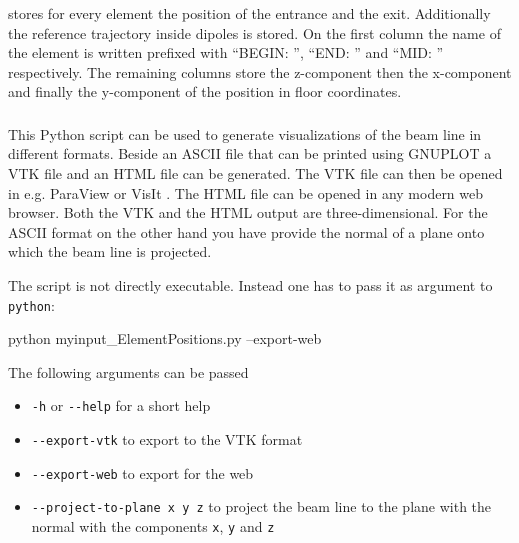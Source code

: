 \subsubsection*{}
\opalt stores for every element the position of the entrance and the exit. Additionally the reference trajectory inside dipoles is stored. On the first column the name of the element is written prefixed with ``BEGIN: '', ``END: '' and ``MID: '' respectively. The remaining columns store the z-component then the x-component and finally the y-component of the position in floor coordinates.

\subsubsection*{}
This Python script can be used to generate visualizations of the beam line in different formats. Beside an ASCII file that can be printed using GNUPLOT a VTK file and an HTML file can be generated. The VTK file can then be opened in e.g. ParaView \cite{paraview,bib:paraview} or VisIt \cite{bib:visit}. The HTML file can be opened in any modern web browser. Both the VTK and the HTML output are three-dimensional. For the ASCII format on the other hand you have provide the normal of a plane onto which the beam line is projected.

The script is not directly executable. Instead one has to pass it as argument to \texttt{python}:
\begin{example}
python myinput_ElementPositions.py --export-web
\end{example}

The following arguments can be passed
\begin{itemize}
\item \texttt{-h} or \texttt{-{}-help} for a short help
\item \texttt{-{}-export-vtk} to export to the VTK format
\item \texttt{-{}-export-web} to export for the web
\item \texttt{-{}-project-to-plane x y z} to project the beam line to the plane with the normal with the components \texttt{x}, \texttt{y} and \texttt{z}
\end{itemize}

